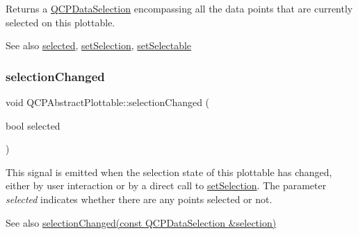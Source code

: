 Returns a \hyperlink{class_q_c_p_data_selection}{Q\+C\+P\+Data\+Selection} encompassing all the data points that are currently selected on this plottable.

\begin{DoxySeeAlso}{See also}
\hyperlink{class_q_c_p_abstract_plottable_a0b3b514474fe93354fc74cfc144184b4}{selected}, \hyperlink{class_q_c_p_abstract_plottable_a219bc5403a9d85d3129165ec3f5ae436}{set\+Selection}, \hyperlink{class_q_c_p_abstract_plottable_ac238d6e910f976f1f30d41c2bca44ac3}{set\+Selectable} 
\end{DoxySeeAlso}
\mbox{\label{class_q_c_p_abstract_plottable_a3af66432b1dca93b28e00e78a8c7c1d9}} 
\subsubsection{\texorpdfstring{selection\+Changed}{selectionChanged}\hspace{0.1cm}{\footnotesize\ttfamily [1/2]}}
{\footnotesize\ttfamily void Q\+C\+P\+Abstract\+Plottable\+::selection\+Changed (\begin{DoxyParamCaption}\item[{bool}]{selected }\end{DoxyParamCaption})\hspace{0.3cm}{\ttfamily [signal]}}

This signal is emitted when the selection state of this plottable has changed, either by user interaction or by a direct call to \hyperlink{class_q_c_p_abstract_plottable_a219bc5403a9d85d3129165ec3f5ae436}{set\+Selection}. The parameter {\itshape selected} indicates whether there are any points selected or not.

\begin{DoxySeeAlso}{See also}
\hyperlink{class_q_c_p_abstract_plottable_a787a9c39421059006891744b731fa473}{selection\+Changed(const Q\+C\+P\+Data\+Selection \&selection)} 
\end{DoxySeeAlso}
\mbox{\label{class_q_c_p_abstract_plottable_a787a9c39421059006891744b731fa473}} 
